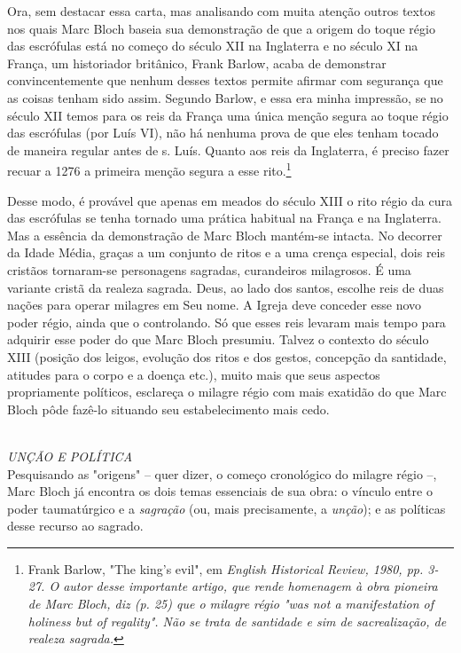 \documentclass[a5paper]{book}
\begin{document}
Ora, sem destacar essa carta, mas analisando com muita atenção outros textos nos quais Marc Bloch baseia sua demonstração de que a origem do toque régio das escrófulas está no começo do século XII na Inglaterra e no século XI na França, um historiador britânico, Frank Barlow, acaba de demonstrar convincentemente que nenhum desses textos permite af{\kern0pt}irmar com segurança que as coisas tenham sido assim. Segundo Barlow, e essa era minha impressão, se no século XII temos para os reis da França uma única menção segura ao toque régio das escrófulas (por Luís VI), não há nenhuma prova de que eles tenham tocado de maneira regular antes de s. Luís. Quanto aos reis da Inglaterra, é preciso fazer recuar a 1276 a primeira menção segura a esse rito.\footnote{Frank Barlow, "The king's evil", em \textit{English Historical Review, 1980, pp. 3-27. O autor desse importante artigo, que rende homenagem à obra pioneira de Marc Bloch, diz (p. 25) que o milagre régio "was not a manifestation of holiness but of regality". Não se trata de santidade e sim de sacrealização, de realeza sagrada.}}

Desse modo, é provável que apenas em meados do século XIII o rito régio da cura das escrófulas se tenha tornado uma prática habitual na França e na Inglaterra. Mas a essência da demonstração de Marc Bloch mantém-se intacta. No decorrer da Idade Média, graças a um conjunto de ritos e a uma crença especial, dois reis cristãos tornaram-se personagens sagradas, curandeiros milagrosos. É uma variante cristã da realeza sagrada. Deus, ao lado dos santos, escolhe reis de duas nações para operar milagres em Seu nome. A Igreja deve conceder esse novo poder régio, ainda que o controlando. Só que esses reis levaram mais tempo para adquirir esse poder do que Marc Bloch presumiu. Talvez o contexto do século XIII (posição dos leigos, evolução dos ritos e dos gestos, concepção da santidade, atitudes para o corpo e a doença etc.), muito mais que seus aspectos propriamente políticos, esclareça o milagre régio com mais exatidão do que Marc Bloch pôde fazê-lo situando seu estabelecimento mais cedo.

~\\ \large \textit{UNÇÃO E POLÍTICA} ~\\

Pesquisando as "origens" {--} quer dizer, o começo cronológico do milagre régio --, Marc Bloch já encontra os dois temas essenciais de sua obra: o vínculo entre o poder taumatúrgico e a \textit{sagração} (ou, mais precisamente, a \textit{unção}); e as políticas desse recurso ao sagrado.
\end{document}
